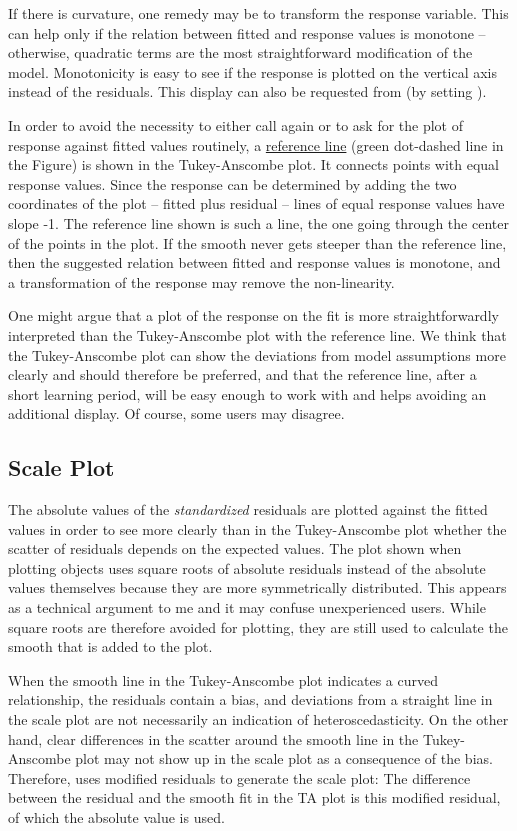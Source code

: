 \documentclass[11pt]{article}
\begin{document}
If there is curvature, one remedy may be to transform the response
variable. This can help only if the relation between fitted and
response values is monotone -- otherwise, quadratic terms are the
most straightforward modification of the model.
Monotonicity is easy to see if the response is plotted on the vertical
axis instead of the residuals.
This display can also be requested from 
(by setting ).

In order to avoid the necessity to either call  again or to 
ask for the plot of response against fitted values routinely,
a \ul{reference line} (green dot-dashed line in the Figure)
is shown in the Tukey-Anscombe plot.
It connects points with equal response values. Since the response can be
determined by adding the two coordinates of the plot -- 
fitted plus residual -- lines of equal response values have slope -1.
The reference line shown is such a line, the one going through the center
of the points in the plot.
If the smooth never gets steeper than the reference line, then the
suggested relation between fitted and response values is monotone, and a
transformation of the response may remove the non-linearity.

One might argue that a plot of the response on the fit is more
straightforwardly interpreted than the Tukey-Anscombe plot with the
reference line. We think that the Tukey-Anscombe plot can show the
deviations from model assumptions more clearly and should therefore be
preferred, and that the reference line, after a short learning period, will
be easy enough to work with and helps avoiding an additional display. 
Of course, some users may disagree.

\subsection{Scale Plot}
The absolute values of the \emph{standardized} residuals are plotted
against the fitted values 
in order to see more clearly than in the Tukey-Anscombe plot whether the 
scatter of residuals depends on the expected values.
The plot shown when plotting  objects uses square roots of absolute
residuals instead of the absolute values themselves because they are more
symmetrically distributed. This appears as a technical argument to me and
it may confuse unexperienced users. While square roots are therefore
avoided for plotting, they are still used to calculate the smooth that is
added to the plot.

When the smooth line in the Tukey-Anscombe plot indicates a curved
relationship, the residuals contain a bias, and deviations from a straight
line in the scale plot are not necessarily an indication of
heteroscedasticity. On the other hand, clear differences in the scatter
around the smooth line in the Tukey-Anscombe plot may not show up in 
the scale plot as a consequence of the bias.
Therefore,  uses modified residuals to generate the scale
plot: The difference between the residual and the smooth fit in the
TA plot is this modified residual, of which the absolute value is used.
\end{document}
